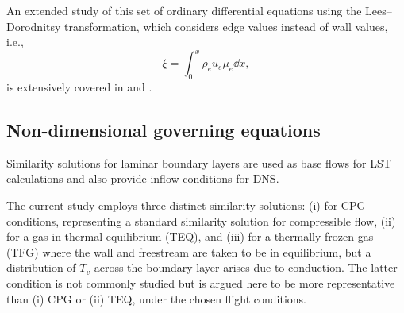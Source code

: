 An extended study of this set of ordinary differential equations using the Lees--Dorodnitsy transformation, which considers edge values instead of wall values, i.e.,
\begin{equation}
    \xi = \int_{0}^{x} \rho_e u_e \mu_e \dd x,
\end{equation}
is extensively covered in \citet[Section~6.5]{Anderson2006} and \citet{Blottner1970}.

\subsection{Non-dimensional governing equations}
Similarity solutions for laminar boundary layers are used as base flows for LST calculations and also provide inflow conditions for DNS.

The current study employs three distinct similarity solutions: (i) for CPG conditions, representing a standard similarity solution for compressible flow, (ii) for a gas in thermal equilibrium (TEQ), and (iii) for a thermally frozen gas (TFG) where the wall and freestream are taken to be in equilibrium, but a distribution of $T_v$ across the boundary layer arises due to conduction. The latter condition is not commonly studied but is argued here to be more representative than (i) CPG or (ii) TEQ, under the chosen flight conditions.

